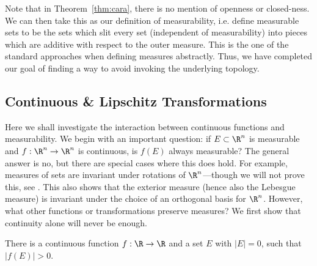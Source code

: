 Note that in Theorem~\ref{thm:cara}, there is no mention of openness or closed-ness. We can then take this as our definition of measurability, i.e. define measurable sets to be the sets which slit every set (independent of measurability) into pieces which are additive with respect to the outer measure. This is the one of the standard approaches when defining measures abstractly. Thus, we have completed our goal of finding a way to avoid invoking the underlying topology. 




\subsection{Continuous \& Lipschitz Transformations}

Here we shall investigate the interaction between continuous functions and measurability. We begin with an important question: if $E \subset \R^n$ is measurable and $f: \R^n \to \R^n$ is continuous, is $f(E)$ always measurable? The general answer is no, but there are special cases where this does hold. For example, measures of sets are invariant under rotations of $\R^n$---though we will not prove this, see \cite[p.~36]{wheedon}. This also shows that the exterior measure (hence also the Lebesgue measure) is invariant under the choice of an orthogonal basis for $\R^n$. However, what other functions or transformations preserve measures? We first show that continuity alone will never be enough. 


\begin{lem} \label{lem:rcontfun}
There is a continuous function $f: \R \to \R$ and a set $E$ with $|E|=0$, such that $|f(E)|>0$.
\end{lem}

